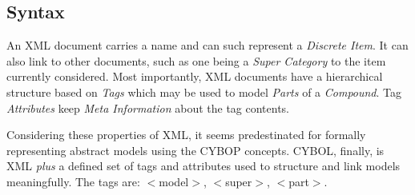 %
%
%
%
%
%
%

\subsection{Syntax}
\label{syntax_heading}

An XML document carries a name and can such represent a \emph{Discrete Item}. It
can also link to other documents, such as one being a \emph{Super Category} to
the item currently considered. Most importantly, XML documents have a hierarchical
structure based on \emph{Tags} which may be used to model \emph{Parts} of a
\emph{Compound}. Tag \emph{Attributes} keep \emph{Meta Information} about the tag
contents.

Considering these properties of XML, it seems predestinated for formally
representing abstract models using the CYBOP concepts. CYBOL, finally, is XML
\emph{plus} a defined set of tags and attributes used to structure and link
models meaningfully. The tags are: \(<\)model\(>\), \(<\)super\(>\), \(<\)part\(>\).
